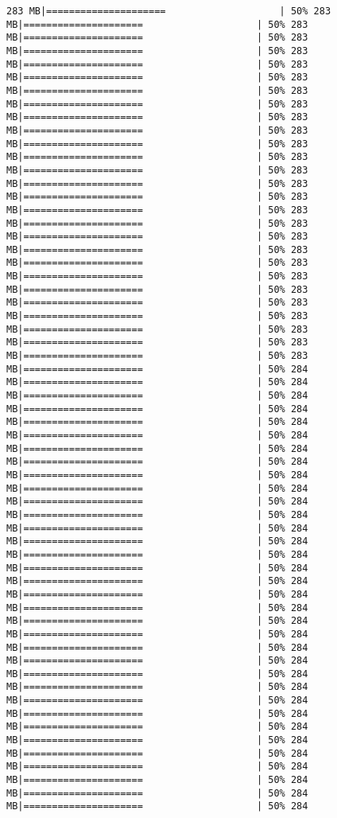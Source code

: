 \documentclass[
]{article}
\begin{document}
\begin{verbatim}
283 MB|=====================                    | 50% 283 MB|=====================                    | 50% 283 MB|=====================                    | 50% 283 MB|=====================                    | 50% 283 MB|=====================                    | 50% 283 MB|=====================                    | 50% 283 MB|=====================                    | 50% 283 MB|=====================                    | 50% 283 MB|=====================                    | 50% 283 MB|=====================                    | 50% 283 MB|=====================                    | 50% 283 MB|=====================                    | 50% 283 MB|=====================                    | 50% 283 MB|=====================                    | 50% 283 MB|=====================                    | 50% 283 MB|=====================                    | 50% 283 MB|=====================                    | 50% 283 MB|=====================                    | 50% 283 MB|=====================                    | 50% 283 MB|=====================                    | 50% 283 MB|=====================                    | 50% 283 MB|=====================                    | 50% 283 MB|=====================                    | 50% 283 MB|=====================                    | 50% 283 MB|=====================                    | 50% 283 MB|=====================                    | 50% 283 MB|=====================                    | 50% 283 MB|=====================                    | 50% 284 MB|=====================                    | 50% 284 MB|=====================                    | 50% 284 MB|=====================                    | 50% 284 MB|=====================                    | 50% 284 MB|=====================                    | 50% 284 MB|=====================                    | 50% 284 MB|=====================                    | 50% 284 MB|=====================                    | 50% 284 MB|=====================                    | 50% 284 MB|=====================                    | 50% 284 MB|=====================                    | 50% 284 MB|=====================                    | 50% 284 MB|=====================                    | 50% 284 MB|=====================                    | 50% 284 MB|=====================                    | 50% 284 MB|=====================                    | 50% 284 MB|=====================                    | 50% 284 MB|=====================                    | 50% 284 MB|=====================                    | 50% 284 MB|=====================                    | 50% 284 MB|=====================                    | 50% 284 MB|=====================                    | 50% 284 MB|=====================                    | 50% 284 MB|=====================                    | 50% 284 MB|=====================                    | 50% 284 MB|=====================                    | 50% 284 MB|=====================                    | 50% 284 MB|=====================                    | 50% 284 MB|=====================                    | 50% 284 MB|=====================                    | 50% 284 MB|=====================                    | 50% 284 MB|=====================                    | 50% 284 MB|=====================                    | 50% 284 
\end{verbatim}
\end{document}
